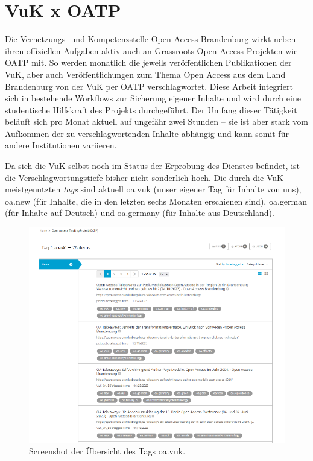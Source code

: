 \documentclass[a4paper,
fontsize=11pt,
oneside,
numbers=noperiodatend,
parskip=half-,
bibliography=totoc,
final
]{scrartcl}
\begin{document}
\hypertarget{vuk-x-oatp}{%
\section{VuK x OATP}\label{vuk-x-oatp}}

Die Vernetzungs- und Kompetenzstelle Open Access Brandenburg wirkt neben
ihren offiziellen Aufgaben aktiv auch an
Grassroots-Open-Access-Projekten wie OATP mit. So werden monatlich die
jeweils veröffentlichen Publikationen der VuK, aber auch
Veröffentlichungen zum Thema Open Access aus dem Land Brandenburg von
der VuK per OATP verschlagwortet. Diese Arbeit integriert sich in
bestehende Workflows zur Sicherung eigener Inhalte und wird durch eine
studentische Hilfskraft des Projekts durchgeführt. Der Umfang dieser
Tätigkeit beläuft sich pro Monat aktuell auf ungefähr zwei Stunden --
sie ist aber stark vom Aufkommen der zu verschlagwortenden Inhalte
abhängig und kann somit für andere Institutionen variieren.

Da sich die VuK selbst noch im Status der Erprobung des Dienstes
befindet, ist die Verschlagwortungstiefe bisher nicht sonderlich hoch.
Die durch die VuK meistgenutzten \emph{tags} sind aktuell oa.vuk (unser
eigener Tag für Inhalte von uns), oa.new (für Inhalte, die in den
letzten sechs Monaten erschienen sind), oa.german (für Inhalte auf
Deutsch) und oa.germany (für Inhalte aus Deutschland).

\begin{figure}
\centering
\includegraphics{img_2.png}
\caption{Screenshot der Übersicht des Tags oa.vuk.}
\end{figure}
\end{document}
